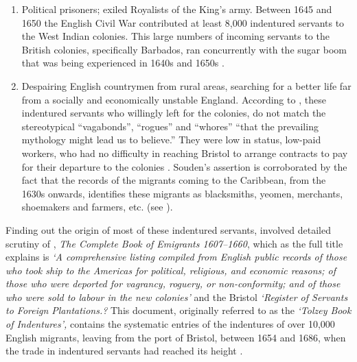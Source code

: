 \renewcommand{\labelenumii}{\theenumii}
\begin{enumerate}
\item{Political prisoners; exiled Royalists of the King's army. Between 1645 and 1650 the English Civil War contributed at least 8,000 indentured servants to the West Indian colonies. This large numbers of incoming servants to the British colonies, specifically Barbados, ran concurrently with the sugar boom that was being experienced in 1640s and 1650s \citep{Brewer96}.}
\item{Despairing English countrymen from rural areas, searching for a better life far from a socially and economically unstable England. According to \citet[167]{Souden88}, these indentured servants who willingly left for the colonies, do not match the stereotypical ``vagabonds'', ``rogues'' and ``whores'' ``that the prevailing mythology might lead us to believe.'' They were low in status, low-paid workers, who had no difficulty in reaching Bristol to arrange contracts to pay for their departure to the colonies \citep{Souden88}. Souden's assertion is corroborated by the fact that the records of the migrants coming to the Caribbean, from the 1630s onwards, identifies these migrants as blacksmiths, yeomen, merchants, shoemakers and farmers, etc. (see \citealt{Coldham87, Sacks93}).}
\end{enumerate}

Finding out the origin of most of these indentured servants, involved detailed scrutiny of  , \emph{The Complete Book of Emigrants 1607--1660}, which as the full title explains is \emph{`A comprehensive listing compiled from English public records of those who took ship to the Americas for political, religious, and economic reasons; of those who were deported for vagrancy, roguery, or non-conformity; and of those who were sold to labour in the new colonies'} and the Bristol \emph{`Register of Servants to Foreign Plantations.?} This document, originally referred to as the \emph{`Tolzey Book of Indentures',} contains the systematic entries of the indentures of over 10,000 English migrants, leaving from the port of Bristol, between 1654 and 1686, when the trade in indentured servants had reached its height \citep{Currer82, Morgan93}.

